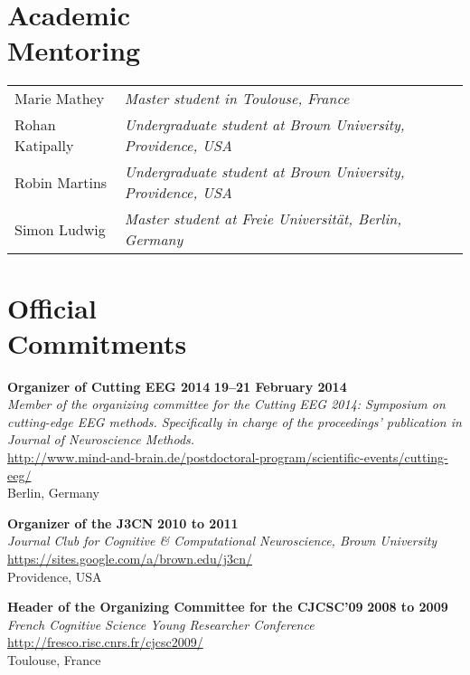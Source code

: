\documentclass[margin,line]{resume}
\begin{document}
\begin{resume}
    \section{\mysidestyle Academic\\Mentoring}
	
	\begin{tabular}{@{}ll} %
	Marie Mathey    & \textsl{Master student in Toulouse, France}                         \\
	Rohan Katipally & \textsl{Undergraduate student at Brown University, Providence, USA} \\
	Robin Martins   & \textsl{Undergraduate student at Brown University, Providence, USA} \\
	Simon Ludwig    & \textsl{Master student at Freie Universität, Berlin, Germany}
	\end{tabular}
	

\newpage

	\vspace{3mm}
    \section{\mysidestyle Official\\ Commitments} %
	
	\textbf{Organizer of Cutting EEG 2014} \hfill \textbf{19–21 February 2014}\\
	\textsl{Member of the organizing committee for the Cutting EEG 2014: Symposium on cutting-edge EEG methods. Specifically in charge of the proceedings' publication in Journal of Neuroscience Methods.}\\
	 \url{http://www.mind-and-brain.de/postdoctoral-program/scientific-events/cutting-eeg/}\\
	Berlin, Germany
	
	\textbf{Organizer of the J3CN} \hfill \textbf{2010 to 2011}\\
	\textsl{Journal Club for Cognitive \& Computational Neuroscience, Brown University}\\
	 \url{https://sites.google.com/a/brown.edu/j3cn/}\\
	Providence, USA	

	\textbf{Header of the Organizing Committee for the CJCSC'09} \hfill \textbf{2008 to 2009}\\
	\textsl{French Cognitive Science Young Researcher Conference}\\
	 \url{http://fresco.risc.cnrs.fr/cjcsc2009/}\\
	Toulouse, France		


\end{resume}
\end{document}
